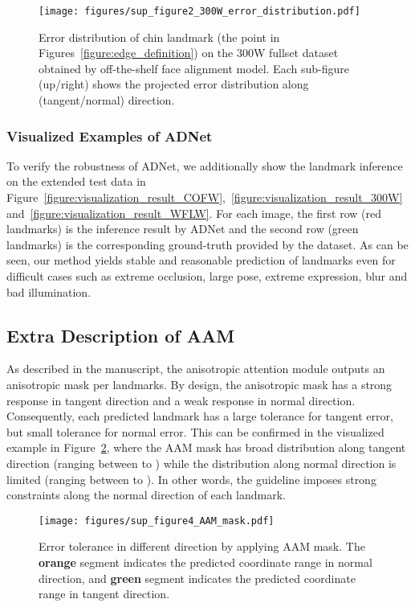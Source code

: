 \documentclass[10pt,twocolumn,letterpaper]{article}
\begin{document}
\begin{figure}[htbp]
\begin{center}
\texttt{[image: figures/sup\_figure2\_300W\_error\_distribution.pdf]}
\end{center}
\vspace{-6mm}
\caption{Error distribution of chin landmark (the  point in Figures~\ref{figure:edge_definition}) on the 300W fullset dataset obtained by off-the-shelf face alignment model. Each sub-figure (up/right) shows the projected error distribution along (tangent/normal) direction.}
\label{figure:error_distribution}
\vspace{-6mm}
\end{figure}


\subsubsection{Visualized Examples of ADNet}
To verify the robustness of ADNet, we additionally show the landmark inference on the extended test data in Figure~\ref{figure:visualization_result_COFW},~\ref{figure:visualization_result_300W}~and~\ref{figure:visualization_result_WFLW}. 
For each image, the first row (red landmarks) is the inference result by ADNet and the second row (green landmarks) is the corresponding ground-truth provided by the dataset.
As can be seen, our method yields stable and reasonable prediction of landmarks even for difficult cases such as extreme occlusion, large pose, extreme expression, blur and bad illumination. 


\subsection{Extra Description of AAM}

As described in the manuscript, the anisotropic attention module outputs an anisotropic mask per landmarks.
By design, the anisotropic mask has a strong response in tangent direction and a weak response in normal direction.
Consequently, each predicted landmark has a large tolerance for tangent error, but small tolerance for normal error.
This can be confirmed in the visualized example in Figure~\ref{figure:AAM_mask}, where the AAM mask has broad distribution along tangent direction (ranging between  to ) while the distribution along normal direction is limited (ranging between  to ). 
In other words, the guideline imposes strong constraints along the normal direction of each landmark.


\begin{figure}[htbp]
\begin{center}
\texttt{[image: figures/sup\_figure4\_AAM\_mask.pdf]}
\end{center}
\vspace{-5mm}
\caption{Error tolerance in different direction by applying AAM mask. The \textbf{\textcolor[rgb]{0.929,0.490,0.1921}{orange}} segment indicates the predicted coordinate range in normal direction, and \textbf{\textcolor[rgb]{0.4392,0.6784,0.2784}{green}} segment indicates the predicted coordinate range in tangent direction.}
\label{figure:AAM_mask}
\vspace{-5mm}
\end{figure}
\end{document}
